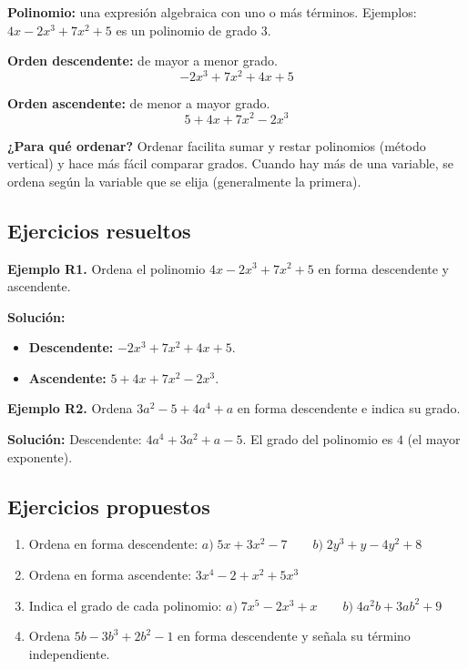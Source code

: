 \documentclass[12pt, letterpaper]{article}
\begin{document}
\begin{cuadroteoria}
  \textbf{Polinomio:} una expresión algebraica con uno o más términos. Ejemplos: $4x - 2x^3 + 7x^2 + 5$ es un polinomio de grado $3$.

  \textbf{Orden descendente:} de mayor a menor grado.
  $$-2x^3 + 7x^2 + 4x + 5$$

  \textbf{Orden ascendente:} de menor a mayor grado.
  $$5 + 4x + 7x^2 - 2x^3$$
\end{cuadroteoria}

\newpage %

\begin{cuadroextra}
  \textbf{¿Para qué ordenar?} Ordenar facilita sumar y restar polinomios (método vertical) y hace más fácil comparar grados. Cuando hay más de una variable, se ordena según la variable que se elija (generalmente la primera).
\end{cuadroextra}

\subsection{Ejercicios resueltos}

\textbf{Ejemplo R1.} Ordena el polinomio $4x - 2x^3 + 7x^2 + 5$ en forma descendente y ascendente.

\begin{cuadrosolucion}
  \textbf{Solución:}
  \begin{itemize}
    \item \textbf{Descendente:} $-2x^3 + 7x^2 + 4x + 5$.
    \item \textbf{Ascendente:} $5 + 4x + 7x^2 - 2x^3$.
  \end{itemize}
\end{cuadrosolucion}

\textbf{Ejemplo R2.} Ordena $3a^2 - 5 + 4a^4 + a$ en forma descendente e indica su grado.

\begin{cuadrosolucion}
  \textbf{Solución:} Descendente: $4a^4 + 3a^2 + a - 5$. El grado del polinomio es $4$ (el mayor exponente).
\end{cuadrosolucion}

\subsection{Ejercicios propuestos}

\begin{enumerate}[leftmargin=*, resume]
  \item \facil{} Ordena en forma descendente: $a) \; 5x + 3x^2 - 7 \qquad b) \; 2y^3 + y - 4y^2 + 8$

  \item \facil{} Ordena en forma ascendente: $3x^4 - 2 + x^2 + 5x^3$

  \item \medio{} Indica el grado de cada polinomio: $a) \; 7x^5 - 2x^3 + x \qquad b) \; 4a^2b + 3ab^2 + 9$

  \item \medio{} Ordena $5b - 3b^3 + 2b^2 - 1$ en forma descendente y señala su término independiente.
\end{enumerate}
\end{document}
